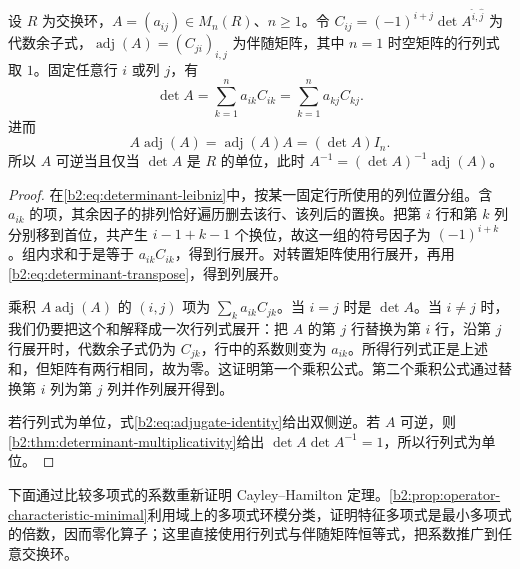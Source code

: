\begin{proposition}[余子式展开与伴随矩阵]\label{b2:prop:adjugate-identity}
	设 \(R\) 为交换环，\(A=(a_{ij})\in M_n(R)\)、\(n\ge1\)。令 \(C_{ij}=(-1)^{i+j}\det A^{\widehat i,\widehat j}\) 为代数余子式，\(\operatorname{adj}(A)=(C_{ji})_{i,j}\) 为伴随矩阵，其中 \(n=1\) 时空矩阵的行列式取 \(1\)。固定任意行 \(i\) 或列 \(j\)，有
	\[
		\det A=\sum_{k=1}^n a_{ik}C_{ik} =\sum_{k=1}^n a_{kj}C_{kj}.
	\]
	进而
	\begin{equation}\label{b2:eq:adjugate-identity}
		A\operatorname{adj}(A)=\operatorname{adj}(A)A=(\det A)I_n.
	\end{equation}
	所以 \(A\) 可逆当且仅当 \(\det A\) 是 \(R\) 的单位，此时 \(A^{-1}=(\det A)^{-1}\operatorname{adj}(A)\)。
\end{proposition}
\begin{proof}
	在\eqref{b2:eq:determinant-leibniz}中，按某一固定行所使用的列位置分组。含 \(a_{ik}\) 的项，其余因子的排列恰好遍历删去该行、该列后的置换。把第 \(i\) 行和第 \(k\) 列分别移到首位，共产生 \(i-1+k-1\) 个换位，故这一组的符号因子为 \((-1)^{i+k}\)。组内求和于是等于 \(a_{ik}C_{ik}\)，得到行展开。对转置矩阵使用行展开，再用\eqref{b2:eq:determinant-transpose}，得到列展开。

	乘积 \(A\operatorname{adj}(A)\) 的 \((i,j)\) 项为 \(\sum_k a_{ik}C_{jk}\)。当 \(i=j\) 时是 \(\det A\)。当 \(i\ne j\) 时，我们仍要把这个和解释成一次行列式展开：把 \(A\) 的第 \(j\) 行替换为第 \(i\) 行，沿第 \(j\) 行展开时，代数余子式仍为 \(C_{jk}\)，行中的系数则变为 \(a_{ik}\)。所得行列式正是上述和，但矩阵有两行相同，故为零。这证明第一个乘积公式。第二个乘积公式通过替换第 \(i\) 列为第 \(j\) 列并作列展开得到。

	若行列式为单位，式\eqref{b2:eq:adjugate-identity}给出双侧逆。若 \(A\) 可逆，则\cref{b2:thm:determinant-multiplicativity}给出 \(\det A\det A^{-1}=1\)，所以行列式为单位。
\end{proof}

下面通过比较多项式的系数重新证明 Cayley–Hamilton 定理。\cref{b2:prop:operator-characteristic-minimal}利用域上的多项式环模分类，证明特征多项式是最小多项式的倍数，因而零化算子；这里直接使用行列式与伴随矩阵恒等式，把系数推广到任意交换环。

